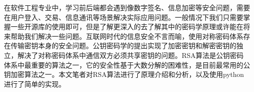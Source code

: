 
\begin{cabstract}
在软件工程专业中，学习前后端都会遇到像数字签名、信息加密等安全问题，需要在用户登入、交易、信息通讯等场景解决实际应用问题。一般情况下我们只需要掌握一些开源库的使用即可，但是了解更深入的去了解其中的密码学原理或许能在将来帮助我们解决一些问题。互联网时代的信息安全不言而喻，使用对称密码体系存在传输密钥本身的安全问题。公钥密码学的提出实现了加密密钥和解密密钥的独立，解决了对称密码体系中通信双方必须共享密钥的问题。RSA算法是公钥密码体系中最重要的算法之一，它的安全性基于大数分解的困难性，是目前最常用的公钥加密算法之一。本文笔者对RSA算法进行了原理介绍和分析，以及使用python进行了简单的实现。
\end{cabstract}

